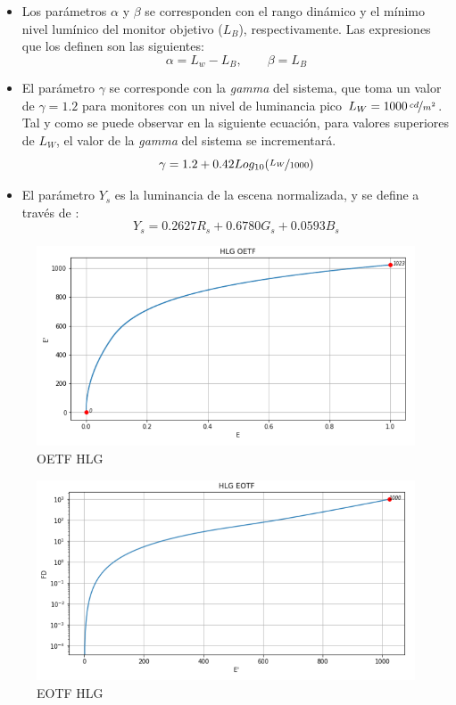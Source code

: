 \documentclass[a4paper, 12pt]{report}
\begin{document}
\begin{itemize}
     \item Los parámetros {\small $\alpha$ y $\beta$ se corresponden con el rango dinámico y el mínimo nivel lumínico del monitor objetivo ($L_B$), respectivamente. Las expresiones que los definen son las siguientes:{\footnotesize $$\alpha = L_w -L_B,\qquad \beta=L_B$$}}
     
      \item {\small El parámetro $\gamma$ se corresponde con la \textit{gamma} del sistema, que toma un valor de $\gamma=1.2$ para monitores con un nivel de luminancia pico $L_W=1000\, \nicefrac{cd}{m^{2}}$. Tal y como se puede observar en la siguiente ecuación,
      para valores superiores de $L_W$, el valor de la \textit{gamma} del sistema se incrementará.{\footnotesize $$\gamma=1.2 + 0.42Log_{10}(\nicefrac{L_W}{1000})$$}}
    \item {\small El parámetro $Y_s$ es la luminancia de la escena normalizada, y se define a través de : {\footnotesize $$Y_s= 0.2627R_s + 0.6780G_s + 0.0593B_s$$}}
\end{itemize}
\normalsize

\begin{figure}[H]
  \centering
  \includegraphics[width=12cm, keepaspectratio]{img/4_Formatos_de_TV_HDR/4_2_Sistema_HLG/2_oetf_lin_lin.png}
  \caption{OETF HLG}
  \label{fig:hlg_graph_oetf}
\end{figure}

\begin{figure}[H]
  \centering
  \includegraphics[width=12cm, keepaspectratio]{img/4_Formatos_de_TV_HDR/4_2_Sistema_HLG/3_eotf_log_lin.png}
  \caption{EOTF HLG}
  \label{fig:hlg_graph_eotf}
\end{figure}
\end{document}

